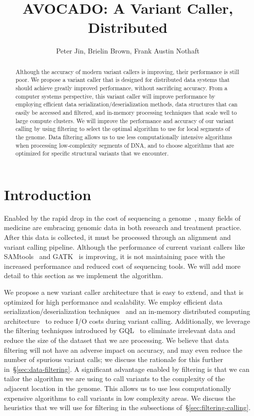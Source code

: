 \documentclass[11pt]{article}
\date{}
\begin{document}
\title{AVOCADO: A Variant Caller, Distributed}
\author{Peter Jin, Brielin Brown, Frank Austin Nothaft}
\maketitle

\begin{abstract}
Although the accuracy of modern variant callers is improving, their performance is still poor. We propose
a variant caller that is designed for distributed data systems that should achieve greatly improved performance,
without sacrificing accuracy.
From a computer systems perspective, this variant caller will improve performance by employing efficient data
serialization/deserialization methods, data structures that can easily be accessed and filtered, and in-memory
processing techniques that scale well to large compute clusters. We will improve the performance and accuracy
of our variant calling by using filtering to select the optimal algorithm to use for local segments of the genome.
Data filtering allows us to use less computationally intensive algorithms when processing low-complexity
segments of DNA, and to choose algorithms that are optimized for specific structural variants that we encounter.
\end{abstract}

\section{Introduction}
\label{sec:introduction}

Enabled by the rapid drop in the cost of sequencing a genome~\cite{nhgri}, many fields of medicine are embracing genomic
data in both research and treatment practice. After this data is collected, it must be processed through an alignment and
variant calling pipeline. Although the performance of current variant callers like SAMtools~\cite{li11} and GATK~\cite{mckenna10}
is improving, it is not maintaining pace with the increased performance and reduced cost of sequencing tools. We will add more
detail to this section as we implement the algorithm.

We propose a new variant caller architecture that is easy to extend, and that is optimized for high performance
and scalability. We employ efficient data serialization/deserialization techniques~\cite{adam} and an in-memory distributed
computing architecture~\cite{zaharia10} to reduce I/O costs during variant calling. Additionally, we leverage the filtering techniques
introduced by GQL~\cite{kozanitis13} to eliminate irrelevant data and reduce the size of the dataset that we are processing.
We believe that data filtering will not have an adverse impact on accuracy, and may even reduce the number of spurious
variant calls; we discuss the rationale for this further in~\S\ref{sec:data-filtering}. A significant
advantage enabled by filtering is that we can tailor the algorithm we are using to call variants to the complexity of the
adjacent location in the genome. This allows us to use less computationally expensive algorithms to call variants in
low complexity areas. We discuss the heuristics that we will use for filtering in the subsections of~\S\ref{sec:filtering-calling}.
\end{document}
